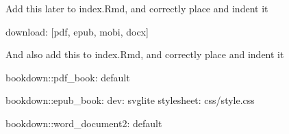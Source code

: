 \documentclass[
  english,
]{book}
\newenvironment{Shaded}{\begin{snugshade}}{\end{snugshade}}
\newcommand{\BaseNTok}[1]{\textcolor[rgb]{0.00,0.00,0.81}{#1}}
\newcommand{\NormalTok}[1]{#1}
\begin{document}
Add this later to index.Rmd, and correctly place and indent it

\begin{Shaded}
\begin{Highlighting}[]
\BaseNTok{      download: [pdf, epub, mobi, docx]}
\end{Highlighting}
\end{Shaded}

And also add this to index.Rmd, and correctly place and indent it

\begin{Shaded}
\begin{Highlighting}[]
\NormalTok{bookdown::pdf\_book: default}

\NormalTok{bookdown::epub\_book:}
\NormalTok{  dev: svglite}
\NormalTok{  stylesheet: css/style.css}

\NormalTok{bookdown::word\_document2:}
\NormalTok{  default}
\end{Highlighting}
\end{Shaded}
\end{document}
